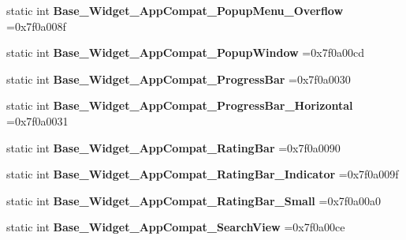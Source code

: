 \begin{DoxyCompactItemize}
static int {\bfseries Base\+\_\+\+Widget\+\_\+\+App\+Compat\+\_\+\+Popup\+Menu\+\_\+\+Overflow} =0x7f0a008f
\item 
\mbox{\label{classandroid_1_1support_1_1v4_1_1R_1_1style_aa17d8835a322d3045cba5b3c6a5880a1}} 
static int {\bfseries Base\+\_\+\+Widget\+\_\+\+App\+Compat\+\_\+\+Popup\+Window} =0x7f0a00cd
\item 
\mbox{\label{classandroid_1_1support_1_1v4_1_1R_1_1style_a9aac12f194a35867682631a7be20dcd0}} 
static int {\bfseries Base\+\_\+\+Widget\+\_\+\+App\+Compat\+\_\+\+Progress\+Bar} =0x7f0a0030
\item 
\mbox{\label{classandroid_1_1support_1_1v4_1_1R_1_1style_a52720eba4ffc6118483cbefa0abc19a7}} 
static int {\bfseries Base\+\_\+\+Widget\+\_\+\+App\+Compat\+\_\+\+Progress\+Bar\+\_\+\+Horizontal} =0x7f0a0031
\item 
\mbox{\label{classandroid_1_1support_1_1v4_1_1R_1_1style_a2774e15d08527ced264fec2fb872f122}} 
static int {\bfseries Base\+\_\+\+Widget\+\_\+\+App\+Compat\+\_\+\+Rating\+Bar} =0x7f0a0090
\item 
\mbox{\label{classandroid_1_1support_1_1v4_1_1R_1_1style_aadfe84273e27a7f2c3e9d6356bfa0684}} 
static int {\bfseries Base\+\_\+\+Widget\+\_\+\+App\+Compat\+\_\+\+Rating\+Bar\+\_\+\+Indicator} =0x7f0a009f
\item 
\mbox{\label{classandroid_1_1support_1_1v4_1_1R_1_1style_a6cd0cace6d81e8c9e43310cd2ddc3d3b}} 
static int {\bfseries Base\+\_\+\+Widget\+\_\+\+App\+Compat\+\_\+\+Rating\+Bar\+\_\+\+Small} =0x7f0a00a0
\item 
\mbox{\label{classandroid_1_1support_1_1v4_1_1R_1_1style_aec6ebbbd22849bb823906b3f447f438b}} 
static int {\bfseries Base\+\_\+\+Widget\+\_\+\+App\+Compat\+\_\+\+Search\+View} =0x7f0a00ce
\item 
\mbox{\label{classandroid_1_1support_1_1v4_1_1R_1_1style_a9394d62b34f1d800b183d54a57db085e}} 

\end{DoxyCompactItemize}
